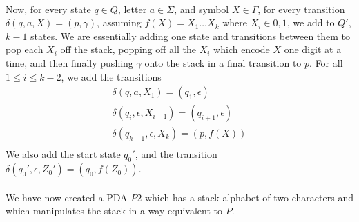 \documentclass[a4paper]{article}
\begin{document}
\begin{itemize}
\\
Now, for every state $q \in Q$, letter $a \in \Sigma$, and symbol $X \in \Gamma$, for every transition $\delta(q,a,X) = (p,\gamma)$, assuming $f(X) = X_1\dots X_k$ where $X_i \in {0,1}$, we add to $Q'$, $k-1$ states. We are essentially adding one state and transitions between them to pop each $X_i$ off the stack, popping off all the $X_i$ which encode $X$ one digit at a time, and then finally pushing $\gamma$ onto the stack in a final transition to $p$.
For all $1 \leq i \leq k-2$, we add the transitions 
\begin{align*}
\delta(q, a, X_{1}) = (q_{1}, \epsilon) \\
\delta(q_i, \epsilon, X_{i+1}) = (q_{i+1}, \epsilon) \\
\delta(q_{k-1}, \epsilon, X_{k}) = (p, f(X)) \\
\end{align*}
We also add the start state $q_0'$, and the transition $\delta(q_0', \epsilon, Z_0') = (q_{0}, f(Z_0))$. \\
\\
We have now created a PDA $P2$ which has a stack alphabet of two characters and which manipulates the stack in a way equivalent to $P$. \\
\\
\\\\\\\\


\end{itemize}
\end{document}
